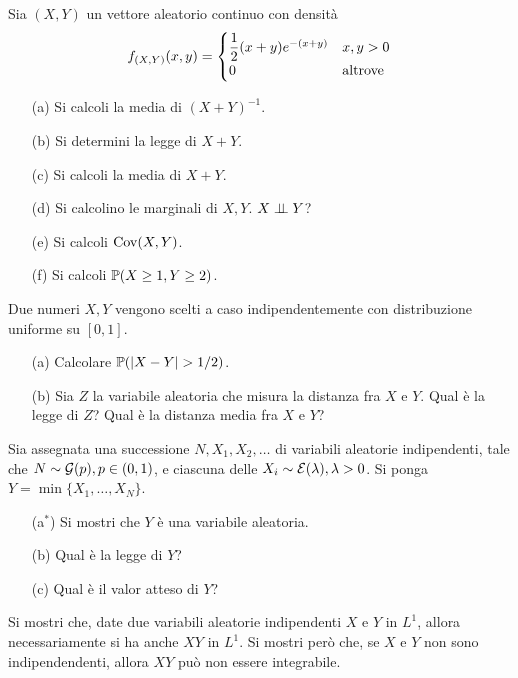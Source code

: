 \Esercizio{}
Sia $(X,Y)$ un vettore aleatorio continuo con densità
\[
f_{(X,Y)}(x,y)=\begin{cases} \dfrac{1}{2}(x+y)e^{-(x+y)} &x,y>0 \\ 0&\text{altrove} \end{cases}
\]
\begin{enumerate}
\item [(a)] Si calcoli la media di $(X+Y)^{-1}$.
\item [(b)] Si determini la legge di $X+Y$.
\item [(c)] Si calcoli la media di $X+Y$.
\item [(d)] Si calcolino le marginali di $X,Y$. $X\perp \!\!\! \perp Y$?
\item [(e)] Si calcoli $\operatorname{Cov}(X,Y)$.
\item [(f)] Si calcoli $\mathbb{P}(X\geq 1,Y\geq 2)$.
\end{enumerate}

\Esercizio{} %
Due numeri $X,Y$ vengono scelti a caso indipendentemente con distribuzione uniforme su $[0,1]$.
\begin{enumerate}
\item [(a)] Calcolare $\PP(|X-Y|>1/2)$.
\item [(b)] Sia $Z$ la variabile aleatoria che misura la distanza fra $X$ e $Y$. Qual è la legge di $Z$? Qual è la distanza media fra $X$ e $Y$?
\end{enumerate}

\Esercizio{} %
Sia assegnata una successione $N,X_1,X_2,\dots$ di variabili aleatorie indipendenti, tale che $N\sim\mathcal{G}(p), p\in(0,1)$, e ciascuna delle $X_i\sim\mathcal{E}(\lambda),\lambda>0$. Si ponga $Y=\min\{X_1,\dots,X_N  \}$.
\begin{enumerate}
\item [(a$^*$)] Si mostri che $Y$ è una variabile aleatoria.
\item [(b)] Qual è la legge di $Y$?
\item [(c)] Qual è il valor atteso di $Y$? 
\end{enumerate}

\Esercizio{} %
Si mostri che, date due variabili aleatorie indipendenti $X$ e $Y$ in $L^1$, allora necessariamente si ha anche $XY$ in $L^1$. Si mostri però che, se $X$ e $Y$ non sono indipendendenti, allora $XY$ può non essere integrabile.

